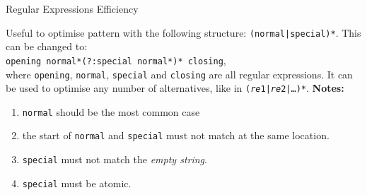 \documentclass[11pt, a4paper, landscape]{scrartcl}
\newcommand{\regex}[1]{\texttt{#1}}
\newcommand{\cregex}[1]{\colorbox{gray!30}{\regex{#1}}}
\newcommand{\re}{\textit{re}}
\begin{document}
\begin{cheatsheet}{Regular Expressions Efficiency}
\begin{col2}
\end{col2}

\begin{col3}


Useful to optimise pattern with the following structure:
\cregex{(normal|special)*}. This can be changed to:\\
\cregex{opening normal*(?:special normal*)* closing},\\
where \regex{opening}, \regex{normal}, \regex{special} and \regex{closing} are
all regular expressions. It can be used to optimise any number of alternatives,
like in \cregex{(\re{}1|\re{}2|\dots)*}. \textbf{Notes:}
\begin{enumerate}
	\item \regex{normal} should be the most common case
	\item the start of \regex{normal} and \regex{special} must not match at the
		same location.
	\item \regex{special} must not match the \emph{empty string}.
	\item \regex{special} must be atomic.
\end{enumerate}

\end{col3}

\end{cheatsheet}

\newpage
\end{document}

